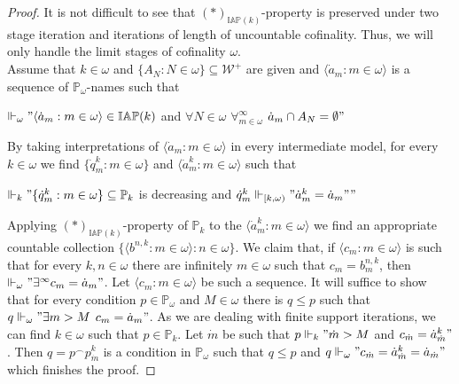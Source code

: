 \documentclass[a4paper]{amsart}
\newcommand{\WANDER}{\mathcal{W}}
\newcommand{\IAP}{\mathbb{IAP}}
\begin{document}
\begin{proof}
It is not difficult to see that $(*)_{\IAP(k)}$-property is preserved under two stage iteration and iterations of length of uncountable cofinality. Thus, we will only handle the limit stages of cofinality $\omega$.\\
Assume that $k\in\omega$ and $\{A_{N}:N\in\omega\}\subseteq\WANDER^{+}$ are given and $\langle\dot{a}_{m}:m\in\omega\rangle$ is a sequence of $\mathbb{P}_{\omega}$-names such that 
\begin{center}
    $\Vdash_{\omega}"\langle\dot{a}_{m}:m\in\omega\rangle\in\IAP(k)$ and $\forall N\in\omega$ $\forall^{\infty}_{m\in\omega}$ $\dot{a}_{m}\cap A_{N}=\emptyset"$
\end{center}
By taking interpretations of $\langle\dot{a}_{m}:m\in\omega\rangle$ in every intermediate model, for every $k\in\omega$ we find $\{\dot{q}^{k}_{m}:m\in\omega\}$ and $\langle\dot{a}^{k}_{m}:m\in\omega\rangle$ such that
\begin{center}
    $\Vdash_{k}"\{\dot{q}^{k}_{m}:m\in\omega\}\subseteq\mathbb{P}_{k}$ is decreasing and $\dot{q}^{k}_{m}\Vdash_{[k,\omega)}"\dot{a}^{k}_{m}=\dot{a}_{m}""$
\end{center}
Applying $(*)_{\IAP(k)}$-property of $\mathbb{P}_{k}$ to the $\langle\dot{a}^{k}_{m}:m\in\omega\rangle$ we find an appropriate countable collection $\{\langle b^{n,k}:m\in\omega\rangle:n\in\omega\}$. We claim that, if $\langle c_{m}:m\in\omega\rangle$ is such that for every $k,n\in\omega$ there are infinitely $m\in\omega$ such that $c_{m}=b^{n,k}_{m}$, then $\Vdash_{\omega}"\exists^{\infty}c_{m}=\dot{a}_{m}"$. Let $\langle c_{m}:m\in\omega\rangle$ be such a sequence. It will suffice to show that for every condition $p\in\mathbb{P}_{\omega}$ and $M\in\omega$ there is $q\leq p$ such that $q\Vdash_{\omega}"\exists m>M$ $ c_{m}=\dot{a}_{m}"$. As we are dealing with finite support iterations, we can find $k\in\omega$ such that $p\in\mathbb{P}_{k}$. Let $\dot{m}$ be such that $p\Vdash_{k}"\dot{m}>M$ and $c_{\dot{m}}=\dot{a}^{k}_{\dot{m}}"$. Then $q=p^{\frown}p^{k}_{\dot{m}}$ is a condition in $\mathbb{P}_{\omega}$ such that $q\leq p$ and $q\Vdash_{\omega}"c_{\dot{m}}=\dot{a}^{k}_{\dot{m}}=\dot{a}_{\dot{m}}"$ which finishes the proof.
\end{proof}
\end{document}
